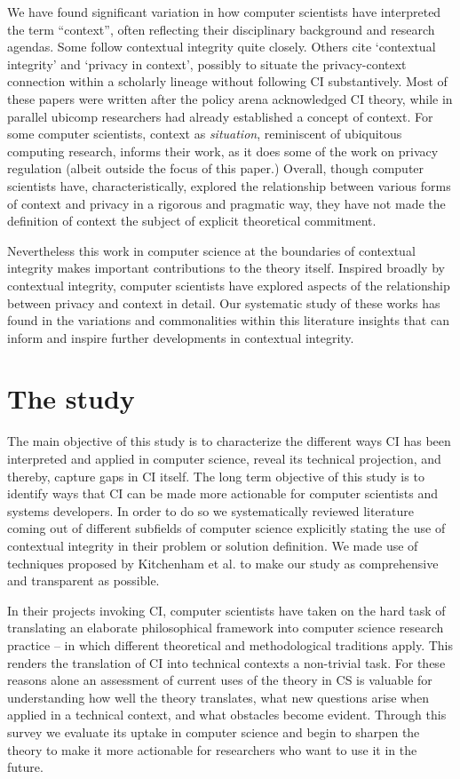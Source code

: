 \documentclass[../thesis.tex]{subfiles}
\begin{document}
We have found significant variation in how computer scientists have
interpreted the term ``context'',
often reflecting their disciplinary background and research agendas.
Some follow contextual integrity quite closely. Others cite
`contextual integrity' and
`privacy in context', possibly to
situate the privacy-context connection within a scholarly lineage
without following CI
substantively. Most of these
papers were written after the policy arena acknowledged CI theory,
while in parallel ubicomp researchers had already established a concept
of context. For some computer scientists, context as
\textit{situation}, reminiscent of ubiquitous computing research,
informs their work, as it does some of the work on privacy regulation
(albeit outside the focus of this paper.) Overall, though computer
scientists have, characteristically, explored the relationship between
various forms of context and privacy in a rigorous and pragmatic way,
they have not made the definition of context the subject of explicit
theoretical commitment.

Nevertheless this work in computer science at the boundaries of
contextual integrity makes important contributions to the theory
itself. Inspired broadly by contextual integrity, computer scientists
have explored aspects of the relationship between privacy and context
in detail. Our systematic study of these works has found in the
variations and commonalities within this literature insights that can
inform and inspire further developments in contextual integrity.

\section{The study}
\label{CI3}

The main objective of this study is to characterize the different ways
CI has been interpreted and applied in computer science, reveal its
technical projection, and thereby, capture gaps in CI itself. The long
term objective of this study is to identify ways that CI can be made
more actionable for computer scientists and systems developers. In
order to do so we systematically reviewed literature coming out of
different subfields of computer science explicitly stating the use of
contextual integrity in their problem or solution definition. We made
use of techniques proposed by Kitchenham et al. \cite{kitchenham2007guidelines} to make our
study as comprehensive and transparent as possible. 

In their projects invoking CI, computer scientists have taken on the
hard task of translating an elaborate philosophical framework into
computer science research practice -- in which different theoretical
and methodological traditions apply.
This renders the translation of CI
into technical contexts a non-trivial task. For these reasons alone an
assessment of current uses of the theory in CS is valuable for
understanding how well the theory translates, what new questions arise
when applied in a technical context, and what obstacles become evident.
Through this survey we evaluate its uptake in computer science and
begin to sharpen the theory to make it more actionable for researchers
who want to use it in the future. 
\end{document}
